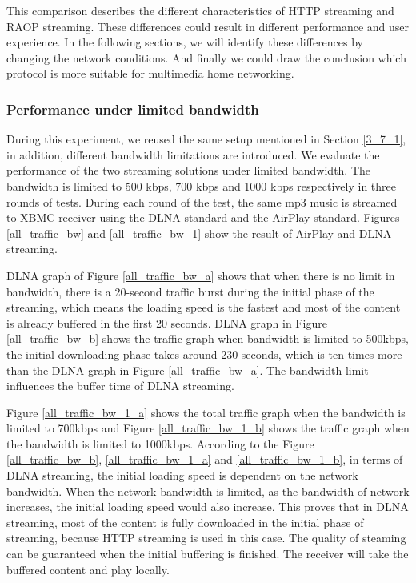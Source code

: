 This comparison describes the different characteristics of HTTP streaming and
RAOP streaming. These differences could result in different performance and
user experience. In the following sections, we will identify these differences
by changing the network conditions. And finally we could draw the conclusion
which protocol is more suitable for multimedia home networking.
\subsubsection{Performance under limited bandwidth\label{4_1_2}}
During this experiment, we reused the same setup mentioned in Section
\ref{3_7_1}, in addition, different bandwidth limitations are introduced. We
evaluate the performance of the two streaming solutions under limited
bandwidth. The bandwidth is limited to 500 kbps, 700 kbps and 1000 kbps
respectively in three rounds of tests. During each round of the test, the same
mp3 music is streamed to XBMC receiver using the DLNA standard and the AirPlay
standard. Figures \ref{all_traffic_bw} and \ref{all_traffic_bw_1} show the
result of AirPlay and DLNA streaming.

DLNA graph of Figure \ref{all_traffic_bw_a} shows that when there is no limit
in bandwidth, there is a 20-second traffic burst during the initial phase of the
streaming, which means the loading speed is the fastest and most of the content
is already buffered in the first 20 seconds. DLNA graph in Figure
\ref{all_traffic_bw_b} shows the traffic graph when bandwidth is limited to
500kbps, the initial downloading phase takes around 230 seconds, which is ten
times more than the DLNA graph in Figure \ref{all_traffic_bw_a}. The bandwidth
limit influences the buffer time of DLNA streaming.

Figure \ref{all_traffic_bw_1_a} shows the total traffic graph when the
bandwidth is limited to 700kbps and Figure \ref{all_traffic_bw_1_b} shows the
traffic graph when the bandwidth is limited to 1000kbps. According to the
Figure \ref{all_traffic_bw_b}, \ref{all_traffic_bw_1_a} and
\ref{all_traffic_bw_1_b}, in terms of DLNA streaming, the initial loading speed
is dependent on the network bandwidth. When the network bandwidth is
limited, as the bandwidth of network increases, the initial loading speed would
also increase. This proves that in DLNA streaming, most of the content is fully
downloaded in the initial phase of streaming, because HTTP streaming is used in
this case. The quality of steaming can be guaranteed when the initial buffering
is finished. The receiver will take the buffered content and play locally.

